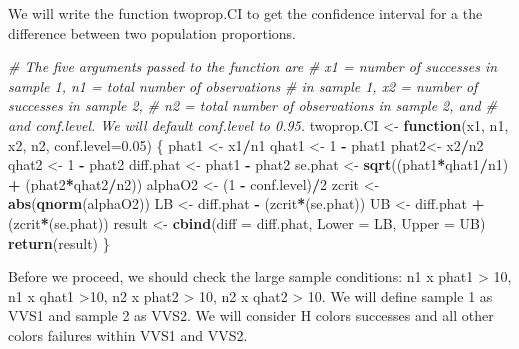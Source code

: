 \documentclass[
]{article}
\newenvironment{Shaded}{\begin{snugshade}}{\end{snugshade}}
\newcommand{\CommentTok}[1]{\textcolor[rgb]{0.56,0.35,0.01}{\textit{#1}}}
\newcommand{\ControlFlowTok}[1]{\textcolor[rgb]{0.13,0.29,0.53}{\textbf{#1}}}
\newcommand{\DataTypeTok}[1]{\textcolor[rgb]{0.13,0.29,0.53}{#1}}
\newcommand{\DecValTok}[1]{\textcolor[rgb]{0.00,0.00,0.81}{#1}}
\newcommand{\FloatTok}[1]{\textcolor[rgb]{0.00,0.00,0.81}{#1}}
\newcommand{\KeywordTok}[1]{\textcolor[rgb]{0.13,0.29,0.53}{\textbf{#1}}}
\newcommand{\NormalTok}[1]{#1}
\newcommand{\OperatorTok}[1]{\textcolor[rgb]{0.81,0.36,0.00}{\textbf{#1}}}
\newcommand{\StringTok}[1]{\textcolor[rgb]{0.31,0.60,0.02}{#1}}
\begin{document}
We will write the function twoprop.CI to get the confidence interval for
a the difference between two population proportions.

\begin{Shaded}
\begin{Highlighting}[]
\CommentTok{# The five arguments passed to the function are}
\CommentTok{# x1 = number of successes in sample 1, n1 = total number of observations}
\CommentTok{# in sample 1, x2 = number of successes in sample 2,}
\CommentTok{# n2 = total number of observations in sample 2, and }
\CommentTok{# and conf.level. We will default conf.level to 0.95.}
\NormalTok{twoprop.CI <-}\StringTok{ }\ControlFlowTok{function}\NormalTok{(x1, n1, x2, n2, }\DataTypeTok{conf.level=}\FloatTok{0.05}\NormalTok{) \{}
\NormalTok{  phat1 <-}\StringTok{ }\NormalTok{x1}\OperatorTok{/}\NormalTok{n1}
\NormalTok{  qhat1 <-}\StringTok{ }\DecValTok{1} \OperatorTok{-}\StringTok{ }\NormalTok{phat1}
\NormalTok{  phat2<-}\StringTok{ }\NormalTok{x2}\OperatorTok{/}\NormalTok{n2}
\NormalTok{  qhat2 <-}\StringTok{ }\DecValTok{1} \OperatorTok{-}\StringTok{ }\NormalTok{phat2 }
\NormalTok{  diff.phat <-}\StringTok{ }\NormalTok{phat1 }\OperatorTok{-}\StringTok{ }\NormalTok{phat2}
\NormalTok{  se.phat <-}\StringTok{ }\KeywordTok{sqrt}\NormalTok{((phat1}\OperatorTok{*}\NormalTok{qhat1}\OperatorTok{/}\NormalTok{n1) }\OperatorTok{+}\StringTok{ }\NormalTok{(phat2}\OperatorTok{*}\NormalTok{qhat2}\OperatorTok{/}\NormalTok{n2))}
\NormalTok{  alphaO2 <-}\StringTok{ }\NormalTok{(}\DecValTok{1} \OperatorTok{-}\StringTok{ }\NormalTok{conf.level)}\OperatorTok{/}\DecValTok{2}
\NormalTok{  zcrit <-}\StringTok{ }\KeywordTok{abs}\NormalTok{(}\KeywordTok{qnorm}\NormalTok{(alphaO2))}
\NormalTok{  LB <-}\StringTok{ }\NormalTok{diff.phat }\OperatorTok{-}\StringTok{ }\NormalTok{(zcrit}\OperatorTok{*}\NormalTok{(se.phat))}
\NormalTok{  UB <-}\StringTok{ }\NormalTok{diff.phat }\OperatorTok{+}\StringTok{ }\NormalTok{(zcrit}\OperatorTok{*}\NormalTok{(se.phat))}
\NormalTok{  result <-}\StringTok{ }\KeywordTok{cbind}\NormalTok{(}\DataTypeTok{diff =}\NormalTok{ diff.phat, }\DataTypeTok{Lower =}\NormalTok{ LB, }\DataTypeTok{Upper =}\NormalTok{ UB)}
  \KeywordTok{return}\NormalTok{(result)}
\NormalTok{\}}
\end{Highlighting}
\end{Shaded}

Before we proceed, we should check the large sample conditions: n1 x
phat1 \textgreater{} 10, n1 x qhat1 \textgreater10, n2 x phat2
\textgreater{} 10, n2 x qhat2 \textgreater{} 10. We will define sample 1
as VVS1 and sample 2 as VVS2. We will consider H colors successes and
all other colors failures within VVS1 and VVS2.
\end{document}
